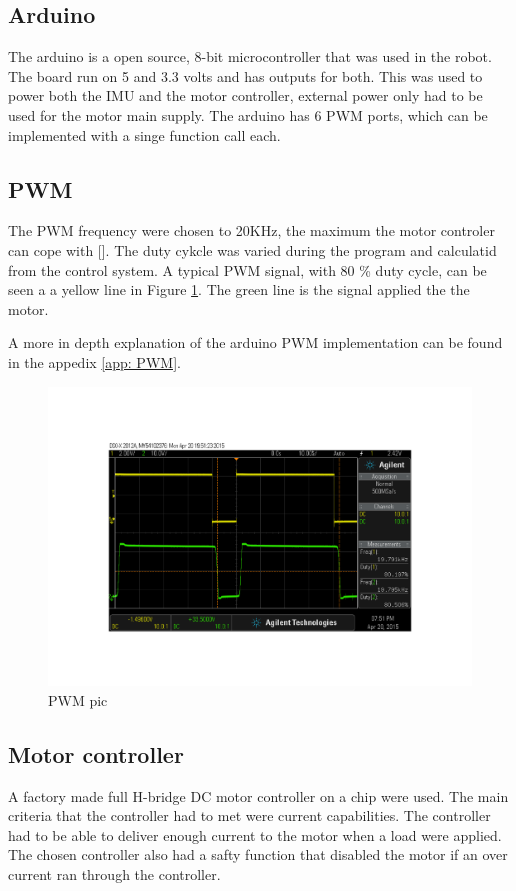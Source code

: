 \documentclass[a4paper,11pt]{kth-mag}
\begin{document}
\subsection{Arduino}
The arduino is a open source, 8-bit microcontroller that was used in the robot. 
The board run on 5 and 3.3 volts and has outputs for both. This was used to power both the IMU and the motor controller, external power only had to be used for the motor main supply. 
The arduino has 6 PWM ports, which can be implemented with a singe function call each.

\subsection{PWM}
The PWM frequency were chosen to 20KHz, the maximum the motor controler can cope with []. The duty cykcle was varied during the program and calculatid from the control system. A typical PWM signal, with 80 \%  duty cycle, can be seen a a yellow line in Figure \ref{Fig: PWMscope}. The green line is the signal applied the the motor.

A more in depth explanation of the arduino PWM implementation can be found in the appedix \ref{app: PWM}.
\begin{figure}[!Hbt]
\centering
\includegraphics[width = \textwidth]{PWMpic.pdf}
\caption{PWM pic}
\label{Fig: PWMscope}
\end{figure} 

\subsection{Motor controller}
A factory made full H-bridge DC motor controller on a chip were used. The main criteria that the controller had to met were current capabilities. The controller had to be able to deliver enough current to the motor when a load were applied. The chosen controller also had a safty function that disabled the motor if an over current ran through the controller.
\end{document}
